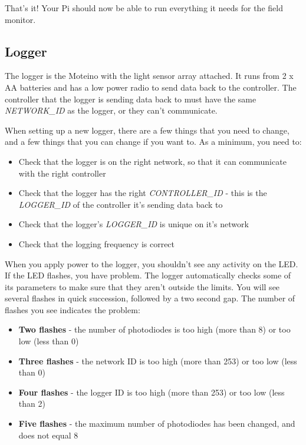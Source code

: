 \documentclass[10pt]{article}
\begin{document}
That's it! Your Pi should now be able to run everything it needs for the field monitor.

\subsection{Logger}
The logger is the Moteino with the light sensor array attached. It runs from 2 x AA batteries and has a low power radio to send data back to the controller. The controller
that the logger is sending data back to must have the same \textit{NETWORK\_ID} as the logger, or they can't communicate.

When setting up a new logger, there are a few things that you need to change, and a few things that you can change if you want to. As a minimum, you need to:

\begin{itemize}
 \item Check that the logger is on the right network, so that it can communicate with the right controller
 \item Check that the logger has the right \textit{CONTROLLER\_ID} - this is the \textit{LOGGER\_ID} of the controller it's sending data back to
 \item Check that the logger's \textit{LOGGER\_ID} is unique on it's network
 \item Check that the logging frequency is correct
\end{itemize}

When you apply power to the logger, you shouldn't see any activity on the LED. If the LED flashes, you have problem. The logger automatically checks some of its parameters to make sure that they aren't outside the limits. You will see several flashes in quick succession, followed by a two second gap. The number of flashes you see indicates the problem:

\begin{itemize}
 \item \textbf{Two flashes}	- the number of photodiodes is too high (more than 8) or too low (less than 0)
 \item \textbf{Three flashes}	- the network ID is too high (more than 253) or too low (less than 0)
 \item \textbf{Four flashes}	- the logger ID is too high (more than 253) or too low (less than 2)
 \item \textbf{Five flashes}	- the maximum number of photodiodes has been changed, and does not equal 8
\end{itemize}
   
\end{document}
